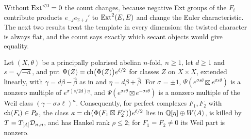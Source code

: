 Without $\operatorname{Ext}^{<0}=0$ the count changes, because negative Ext groups of the
$F_{i}$ contribute products $e_{-j}e_{2+j}'$ to $\operatorname{Ext}^{2}(E,E)$ and change the
Euler characteristic. The next two results treat the template in every
dimension: the twisted character is always flat, and the count says exactly
which secant objects would give equality.

\begin{proposition}\label{prop:flatall}
Let $(X,\theta)$ be a principally polarised abelian $n$-fold, $n\ge1$, let
$d\ge1$ and $s=\sqrt{-d}$, and put $\Psi(Z)=\operatorname{ch}\bigl(\Phi(Z)\bigr)e^{\ell/2}$
for classes $Z$ on $X\times X$, extended linearly, with $\gamma=d\beta-\widehat\beta$
as in  and $\eta=d\beta+\widehat\beta$. For $\sigma=\pm1$, $\Psi(e^{\sigma s\theta}\boxtimes
e^{\sigma s\theta})$ is a nonzero multiple of $e^{\sigma(s/2d)\eta}$, and
$\Psi(e^{\sigma s\theta}\boxtimes e^{-\sigma s\theta})$ is a nonzero multiple of the
Weil class $(\gamma-\sigma s\ell)^{n}$. Consequently, for perfect complexes
$F_{1},F_{2}$ with $\operatorname{ch}(F_{i})\in P_{\theta}$, the class
$\kappa=\operatorname{ch}\bigl(\Phi(F_{1}\boxtimes F_{2}^{\vee})\bigr)e^{\ell/2}$ lies in
$\mathbb{Q}[\eta]\oplus W(A)$, is killed by $T=T_{[A]}\mathcal{D}_{n,n}$, and has Hankel rank
$\rho\le2$; for $F_{1}=F_{2}\ne0$ its Weil part is nonzero.
\end{proposition}

